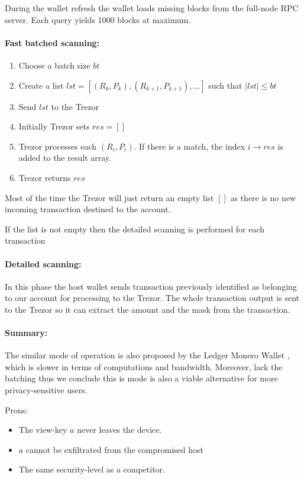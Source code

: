 \documentclass[]{article}
\begin{document}
\;
During the wallet refresh the wallet loads missing blocks from the full-node RPC server. Each query yields 1000 blocks at maximum. 

\paragraph{Fast batched scanning:}
\begin{enumerate}
	\item Choose a batch size $bt$
	\item Create a list $lst = [(R_k, P_k), (R_{k+1}, P_{k+1}), ...]$ such that $|lst| \leq bt$
	\item Send $lst$ to the Trezor
	\item Initially Trezor sets $res = []$
	\item Trezor processes each $(R_i, P_i)$. If there is a match, the index $i \rightarrow res$ is added to the result array.
	\item Trezor returns $res$ 
\end{enumerate}
Most of the time the Trezor will just return an empty list $[]$ as there is no new incoming transaction destined to the account. 

If the list is not empty then the detailed scanning is performed for each transaction

\paragraph{Detailed scanning:} In this phase the host wallet sends transaction previously identified as belonging to our account for processing to the Trezor. The whole transaction output is sent to the Trezor so it can extract the amount and the mask from the transaction.

\paragraph{Summary:}
The similar mode of operation is also proposed by the Ledger Monero Wallet \cite{ledger_doc}, which is slower in terms of computations and bandwidth. Moreover, lack the batching thus we conclude this is mode is also a viable alternative for more privacy-sensitive users.

\noindent Prons:
\begin{itemize}
	\item The view-key $a$ never leaves the device.
	\item $a$ cannot be exfiltrated from the compromised host
	\item The same security-level as a competitor.
\end{itemize}
\end{document}
